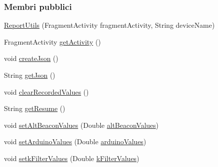 \subsubsection*{Membri pubblici}
\begin{DoxyCompactItemize}
\item 
\hyperlink{classit_1_1unibo_1_1torsello_1_1bluetoothpositioning_1_1util_1_1ReportUtils_af9975aaf0a16c6a51afd258b8c3f77c0_af9975aaf0a16c6a51afd258b8c3f77c0}{Report\+Utils} (Fragment\+Activity fragment\+Activity, String device\+Name)
\item 
Fragment\+Activity \hyperlink{classit_1_1unibo_1_1torsello_1_1bluetoothpositioning_1_1util_1_1ReportUtils_a397da2904c606315301d19eb39451181_a397da2904c606315301d19eb39451181}{get\+Activity} ()
\item 
void \hyperlink{classit_1_1unibo_1_1torsello_1_1bluetoothpositioning_1_1util_1_1ReportUtils_a9157e4b2593b8ceaae5448cfff96f4c4_a9157e4b2593b8ceaae5448cfff96f4c4}{create\+Json} ()
\item 
String \hyperlink{classit_1_1unibo_1_1torsello_1_1bluetoothpositioning_1_1util_1_1ReportUtils_a768356af2517bb604a39daf2497fc761_a768356af2517bb604a39daf2497fc761}{get\+Json} ()
\item 
void \hyperlink{classit_1_1unibo_1_1torsello_1_1bluetoothpositioning_1_1util_1_1ReportUtils_aa83960dff58c2975a142c6b093abf72a_aa83960dff58c2975a142c6b093abf72a}{clear\+Recorded\+Values} ()
\item 
String \hyperlink{classit_1_1unibo_1_1torsello_1_1bluetoothpositioning_1_1util_1_1ReportUtils_a2b62843f2c0da4743686ca60edfc3aed_a2b62843f2c0da4743686ca60edfc3aed}{get\+Resume} ()
\item 
void \hyperlink{classit_1_1unibo_1_1torsello_1_1bluetoothpositioning_1_1util_1_1ReportUtils_ae68aaee9a1033dd6659cc3d6af970f60_ae68aaee9a1033dd6659cc3d6af970f60}{set\+Alt\+Beacon\+Values} (Double \hyperlink{classit_1_1unibo_1_1torsello_1_1bluetoothpositioning_1_1util_1_1ReportUtils_a6e72cc0d840390d44e6cbccece68e240_a6e72cc0d840390d44e6cbccece68e240}{alt\+Beacon\+Values})
\item 
void \hyperlink{classit_1_1unibo_1_1torsello_1_1bluetoothpositioning_1_1util_1_1ReportUtils_a3fbc76f4a952ebae654b238dbef6ca1d_a3fbc76f4a952ebae654b238dbef6ca1d}{set\+Arduino\+Values} (Double \hyperlink{classit_1_1unibo_1_1torsello_1_1bluetoothpositioning_1_1util_1_1ReportUtils_a3557dcc1662461b46fcd4d18eee9780e_a3557dcc1662461b46fcd4d18eee9780e}{arduino\+Values})
\item 
void \hyperlink{classit_1_1unibo_1_1torsello_1_1bluetoothpositioning_1_1util_1_1ReportUtils_a081697bebaa8ef8f7d245f9a7da917fa_a081697bebaa8ef8f7d245f9a7da917fa}{setk\+Filter\+Values} (Double \hyperlink{classit_1_1unibo_1_1torsello_1_1bluetoothpositioning_1_1util_1_1ReportUtils_a9a40344497c5522bbc90f03581c2713a_a9a40344497c5522bbc90f03581c2713a}{k\+Filter\+Values})

\end{DoxyCompactItemize}
